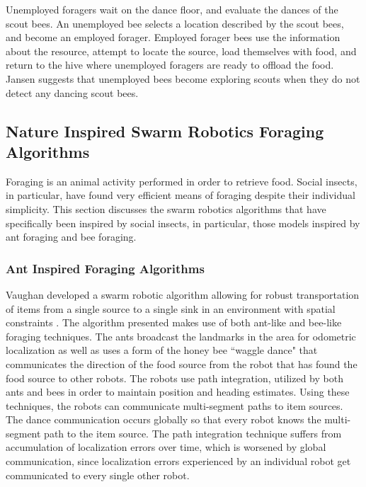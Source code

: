 \documentclass[preprint,12pt]{elsarticle}
\begin{document}
Unemployed foragers wait on the dance floor, and evaluate the dances of the scout bees. An unemployed bee selects a location described by the scout bees, and become an employed forager. Employed forager bees use the information about the resource, attempt to locate the source, load themselves with food, and return to the hive where unemployed foragers are ready to offload the food. Jansen \cite{janson2007searching} suggests that unemployed bees become exploring scouts when they do not detect any dancing scout bees. 


\subsection{Nature Inspired Swarm Robotics Foraging Algorithms}
\label{sec:second:natureinspiredalgs}
Foraging is an animal activity performed in order to retrieve food. Social insects, in particular, have found very efficient means of foraging despite their individual simplicity. This section discusses the swarm robotics algorithms that have specifically been inspired by social insects, in particular, those models inspired by ant foraging and bee foraging. 


\subsubsection{Ant Inspired Foraging Algorithms}
\label{sec:second:natureinspired:ant}

Vaughan developed a swarm robotic algorithm allowing for robust transportation of items from a single source to a single sink in an environment with spatial constraints \cite{vaughan2000blazing}. The algorithm presented makes use of both ant-like and bee-like foraging techniques. The ants broadcast the landmarks in the area for odometric localization as well as uses a form of the  honey bee ``waggle dance" that communicates the direction of the food source from the robot that has found the food source to other robots. The robots use path integration, utilized by both ants and bees in order to maintain position and heading estimates. Using these techniques, the robots can communicate multi-segment paths to item sources. The dance communication occurs globally so that every robot knows the multi-segment path to the item source. The path integration technique suffers from accumulation of localization errors over time, which is worsened by global communication, since localization errors experienced by an individual robot get communicated to every single other robot.
\end{document}
